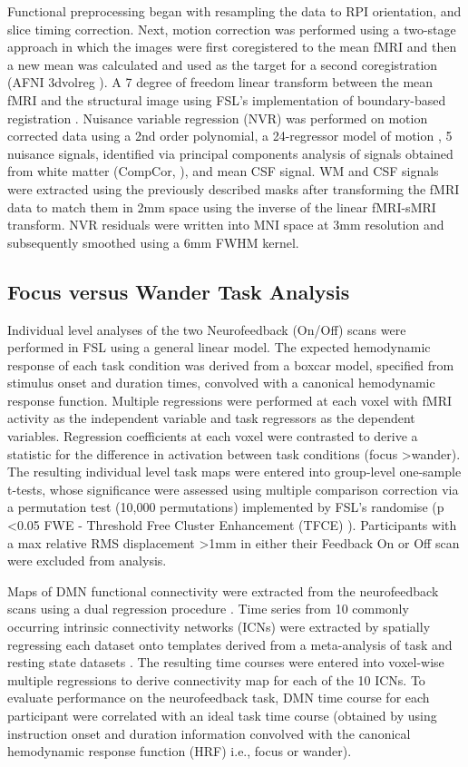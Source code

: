 Functional preprocessing began with resampling the data to RPI orientation, and slice timing correction. Next, motion correction was performed using a two-stage approach in which the images were first coregistered to the mean fMRI and then a new mean was calculated and used as the target for a second coregistration (AFNI 3dvolreg \cite{Cox_1999}). A 7 degree of freedom linear transform between the mean fMRI and the structural image using FSL's implementation of boundary-based registration \cite{Greve_2009}. Nuisance variable regression (NVR) was performed on motion corrected data using a 2nd order polynomial, a 24-regressor model of motion \cite{Friston_1996}, 5 nuisance signals, identified via principal components analysis of signals obtained from white matter (CompCor, \cite{Behzadi_2007}), and mean CSF signal. WM and CSF signals were extracted using the previously described masks after transforming the fMRI data to match them in 2mm space using the inverse of the linear fMRI-sMRI transform. NVR residuals were written into MNI space at 3mm resolution and subsequently smoothed using a 6mm FWHM kernel.

\subsection{Focus versus Wander Task Analysis}

Individual level analyses of the two Neurofeedback (On/Off) scans were performed in FSL using a general linear model. The expected hemodynamic response of each task condition was derived from a boxcar model, specified from stimulus onset and duration times, convolved with a canonical hemodynamic response function. Multiple regressions were performed at each voxel with fMRI activity as the independent variable and task regressors as the dependent variables. Regression coefficients at each voxel were contrasted to derive a statistic for the difference in activation between task conditions (focus \textgreater wander). The resulting individual level task maps were entered into group-level one-sample t-tests, whose significance were assessed using multiple comparison correction via a permutation test (10,000 permutations) implemented by FSL's randomise (p \textless 0.05 FWE - Threshold Free Cluster Enhancement (TFCE) \cite{Smith_2009b,Winkler_2014,Salimi_Khorshidi_2011}). Participants with a max relative RMS displacement \textgreater 1mm in either their Feedback On or Off scan were excluded from analysis. 

Maps of DMN functional connectivity were extracted from the neurofeedback scans using a dual regression procedure \cite{Filippini_2009}. Time series from 10 commonly occurring intrinsic connectivity networks (ICNs) were extracted by spatially regressing each dataset onto templates derived from a meta-analysis of task and resting state datasets \cite{Smith_2009a}. The resulting time courses were entered into voxel-wise multiple regressions to derive connectivity map for each of the 10 ICNs. To evaluate performance on the neurofeedback task, DMN time course for each participant were correlated with an ideal task time course (obtained by using instruction onset and duration information convolved with the canonical hemodynamic response function (HRF)  i.e., focus or wander).


